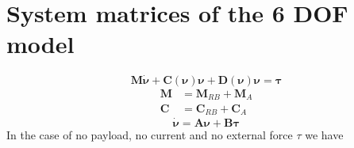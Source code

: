 \documentclass[12pt,a4]{article}
\begin{document}
\section{System matrices of the 6 DOF model}
\begin{equation}
	\bm{M} \bm{\dot{\nu}} + \bm{C}(\bm{\nu})\bm{\nu} + \bm{D}(\bm{\nu})\bm{\nu} = \bm{\tau}
\end{equation}
\begin{align}
	\bm{M} & = \bm{M}_{RB} + \bm{M}_A \\
	\bm{C} & = \bm{C}_{RB} + \bm{C}_A
\end{align}
\begin{equation*}
	\bm{\dot{\nu}} = \bm{A} \bm{\nu} + \bm{B} \bm{\tau}
\end{equation*}
In the case of no payload, no current and no external force $\tau$ we have
\end{document}
